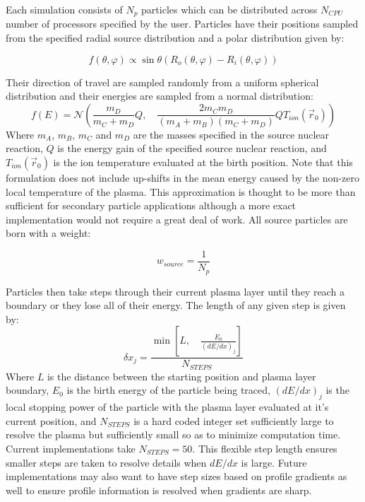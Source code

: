 	Each simulation consists of $N_p$ particles which can be distributed across $N_{CPU}$ number of processors specified by the user. Particles have their positions sampled from the specified radial source distribution and a polar distribution given by: 
	
	\begin{equation}
		f(\theta, \varphi) \propto \sin\theta \left(R_{o}(\theta, \varphi) - R_{i}(\theta, \varphi)\right)
	\end{equation}
	
	Their direction of travel are sampled randomly from a uniform spherical distribution and their energies are sampled from a normal distribution:
	\begin{equation}
		f(E) = \mathcal{N}\left(\frac{m_D}{m_C+m_D}Q, \quad\frac{2m_Cm_D}{(m_A+m_B)(m_C+m_D)}QT_{ion}(\vec{r}_0)\right)
	\end{equation}
	Where $m_A$, $m_B$, $m_C$ and $m_D$ are the masses specified in the source nuclear reaction, $Q$ is the energy gain of the specified source nuclear reaction, and $T_{ion}(\vec{r}_0)$ is the ion temperature evaluated at the birth position. Note that this formulation does not include up-shifts in the mean energy caused by the non-zero local temperature of the plasma. \cite{bibid} This approximation is thought to be more than sufficient for secondary particle applications although a more exact implementation would not require a great deal of work. All source particles are born with a weight:
	
	\begin{equation}
		w_{source}=\frac{1}{N_p}
	\end{equation}
	
	Particles then take steps through their current plasma layer until they reach a boundary or they lose all of their energy. The length of any given step is given by:
	\begin{equation}
		\delta x_j = \frac{\min\left[L, \quad\frac{E_0}{(dE/dx)_j}\right]}{N_{STEPS}}
	\end{equation}
	Where $L$ is the distance between the starting position and plasma layer boundary, $E_0$ is the birth energy of the particle being traced, $(dE/dx)_j$ is the local stopping power of the particle with the plasma layer evaluated at it's current position, and $N_{STEPS}$ is a hard coded integer set sufficiently large to resolve the plasma but sufficiently small so as to minimize computation time. Current implementations take $N_{STEPS}=50$. This flexible step length ensures smaller steps are taken to resolve details when $dE/dx$ is large. Future implementations may also want to have step sizes based on profile gradients as well to ensure profile information is resolved when gradients are sharp.
	
